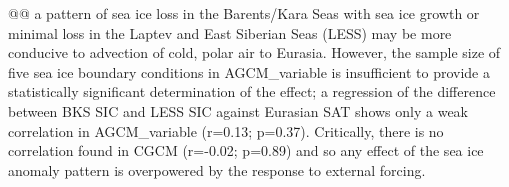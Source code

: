 \documentclass{nature}
\begin{document}



@@ a pattern of sea ice loss in the Barents/Kara Seas with sea ice growth or minimal loss in the Laptev and East Siberian Seas (LESS) may be more conducive to advection of cold, polar air to Eurasia. However, the sample size of five sea ice boundary conditions in AGCM\_variable is insufficient to provide a statistically significant determination of the effect; a regression of the difference between BKS SIC and LESS SIC against Eurasian SAT shows only a weak correlation in AGCM\_variable (r=0.13; p=0.37). Critically, there is no correlation found in CGCM (r=-0.02; p=0.89) and so any effect of the sea ice anomaly pattern is overpowered by the response to external forcing.  %
\end{document}
